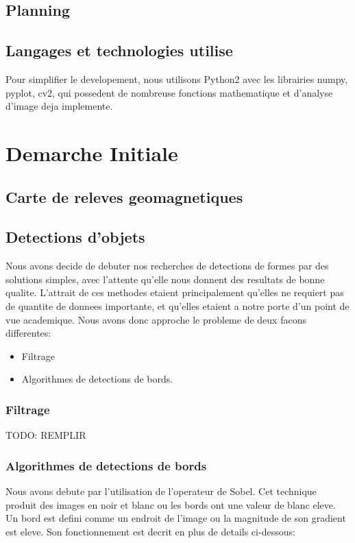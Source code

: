 \documentclass[a4paper, 12pt, titlepage, oneside]{article}
\begin{document}
	\subsection{Planning}
	\subsection{Langages et technologies utilise}
	Pour simplifier le developement, nous utilisons Python2 avec les librairies numpy, pyplot, cv2, qui possedent de nombreuse fonctions mathematique et d'analyse d'image deja implemente.
	\newpage

\section{Demarche Initiale}
	\subsection{Carte de releves geomagnetiques}
	\subsection{Detections d'objets}
	Nous avons decide de debuter nos recherches de detections de formes par des solutions simples, avec l'attente qu'elle nous donnent des resultats de bonne qualite. L'attrait de ces 
	methodes etaient principalement qu'elles ne requiert pas de quantite de donnees importante, et qu'elles etaient a notre porte d'un point de vue academique. Nous avons donc approche
	le probleme de deux facons differentes:
	\begin{itemize}
		\item Filtrage
		\item Algorithmes de detections de bords.
	\end{itemize}
	\subsubsection{Filtrage}
	{TODO: REMPLIR}

	\subsubsection{Algorithmes de detections de bords}
	Nous avons debute par l'utilisation de l'operateur de Sobel. Cet technique produit des images en noir et blanc ou les bords ont une valeur de blanc eleve. Un bord est defini comme un endroit de l'image ou la magnitude de son gradient est eleve. Son fonctionnement est decrit en plus de details ci-dessous: 
\end{document}

